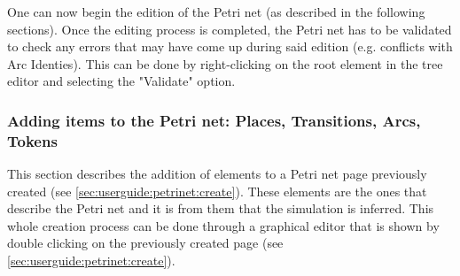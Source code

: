 One can now begin the edition of the Petri net (as described in the following sections). Once the editing process is completed, the Petri net has to be validated to check any errors that may have come up during said edition (e.g. conflicts with Arc Identies). This can be done by right-clicking on  the root element in the tree editor and selecting the "Validate" option.

\subsubsection{Adding items to the Petri net: Places, Transitions, Arcs, Tokens}
\label{sec:userguide:petrinet:add}
This section describes the addition of elements to a Petri net page previously created (see \ref{sec:userguide:petrinet:create}). These elements are the ones that describe the Petri net and it is from them that the simulation is inferred. This whole creation process can be done through a graphical editor that is shown by double clicking on the previously created page (see \ref{sec:userguide:petrinet:create}).

